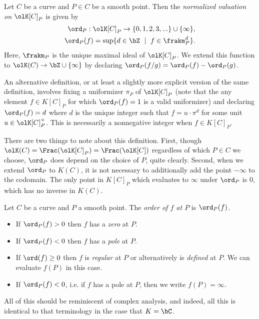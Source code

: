 \begin{defn}\label{defn:normalized-valuation}
	Let $C$ be a curve and $P \in C$ be a smooth point. Then the \emph{normalized valuation on} $\olK[C]_P$ is given by
	\begin{align*}
		\ord_P:\olK[C]_P\to \{0,1,2,3,...\} \cup \{\infty\}, \\
		\ord_P(f) = \sup\{d \in \bZ ~ \mid ~ f\in \frakm^d_P\}.
	\end{align*}
	Here, $\frakm_P$ is the unique maximal ideal of $\olK[C]_P$. We extend this function to $\olK(C)\to \bZ\cup\{\infty\}$ by declaring $\ord_P(f/g) = \ord_P(f) - \ord_P(g)$.
\end{defn}
An alternative definition, or at least a slightly more explicit version of the same definition, involves fixing a uniformizer $\pi_P$ of $\olK[C]_P$ (note that the any element $f \in K[C]_P$ for which $\ord_P(f) = 1$ is a valid uniformizer) and declaring $\ord_P(f) = d$ where $d$ is the unique integer such that $f = u\cdot \pi^d$ for some unit $u \in \olK[C]_P^\times$. This is necessarily a nonnegative integer when $f \in K[C]_P$. 

There are two things to note about this definition. First, though $\olK(C) = \Frac(\olK[C]_P) = \Frac(\olK[C])$ regardless of which $P \in C$ we choose, $\ord_P$ does depend on the choice of $P$, quite clearly. Second, when we extend $\ord_P$ to $K(C)$, it is not necessary to additionally add the point $-\infty$ to the codomain. The only point in $K[C]_P$ which evaluates to $\infty$ under $\ord_P$ is $0$, which has no inverse in $K(C)$.

\begin{defn}\label{defn:order-zero-pole-regular}
	Let $C$ be a curve and $P$ a smooth point. The \emph{order of $f$ at $P$} is $\ord_P(f)$.
	\begin{itemize}
		\item If $\ord_P(f) > 0$ then $f$ has a \emph{zero} at $P$.
		\item If $\ord_P(f) < 0$ then $f$ has a \emph{pole} at $P$.
		\item If $\ord(f) \geq 0$ then $f$ is \emph{regular} at $P$ or alternatively is \emph{defined} at $P$. We can evaluate $f(P)$ in this case.
		\item If $\ord_P(f) < 0$, i.e. if $f$ has a pole at $P$, then we write $f(P) = \infty$.
	\end{itemize}
\end{defn}
All of this should be reminiscent of complex analysis, and indeed, all this is identical to that terminology in the case that $K = \bC$.


